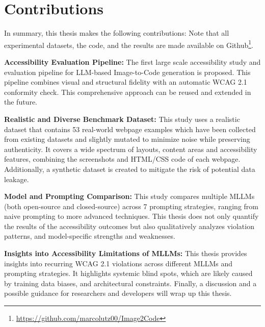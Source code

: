 \section{Contributions}
In summary, this thesis makes the following contributions: \newline
Note that all experimental datasets, the code, and the results are made available on 
Github\footnote{\url{https://github.com/marcolutz00/Image2Code}}.\newline

\textbf{Accessibility Evaluation Pipeline:}
The first large scale accessibility study and evaluation pipeline for LLM-based
Image-to-Code generation is proposed. This pipeline combines visual and structural 
fidelity with an automatic WCAG 2.1 conformity check. This comprehensive 
approach can be reused and extended in the future.\newline

\textbf{Realistic and Diverse Benchmark Dataset:}
This study uses a realistic dataset that contains 53 real-world webpage 
examples which have been collected from existing datasets and slightly mutated to
minimize noise while preserving authenticity. It covers a wide spectrum of layouts, content 
areas and accessibility features, combining the screenshots 
and HTML/CSS code of each webpage. Additionally, a synthetic 
dataset is created to mitigate the risk of potential 
data leakage.\newline

\textbf{Model and Prompting Comparison:}
This study compares multiple MLLMs (both open-source and closed-source) across 7 prompting strategies, ranging 
from naive prompting to more advanced techniques. This thesis does not 
only quantify the results of the accessibility outcomes but also 
qualitatively analyzes violation patterns, and model-specific
strengths and weaknesses.
\newline

\textbf{Insights into Accessibility Limitations of MLLMs:}
This thesis provides insights into recurring WCAG 2.1 violations across 
different MLLMs and prompting strategies. It highlights systemic 
blind spots, which are likely caused by training data biases, 
and architectural constraints. Finally, a discussion and a
possible guidance for researchers and developers will 
wrap up this thesis.






